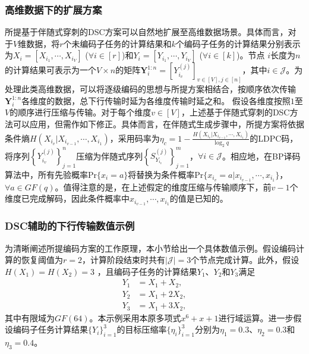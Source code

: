 \subsubsection{高维数据下的扩展方案}
所提基于伴随式穿刺的DSC方案可以自然地扩展至高维数据场景。具体而言，对于$V$维数据，将$r$个未编码子任务的计算结果和$k$个编码子任务的计算结果分别表示为$X_i = [X_{i_1}, \cdots, X_{i_V}]$ ($\forall i \in [r]$)和$Y_i = [Y_{i_1}, \cdots, Y_{i_V}]$ ($\forall i \in [k]$)。节点 $i$长度为$n$的计算结果可表示为一个$V\times n$的矩阵$\mathbf{Y}_i^{1:n} =
\left[Y_{i_v}^{(j)}\right]_{v\in[V],j\in[n]}$，其中$i\in\mathcal{J}$。为处理此类高维数据，可以将逐级编码的思想与所提方案相结合，按顺序依次传输$\mathbf{Y}_i^{1:n}$各维度的数据，总下行传输时延为各维度传输时延之和。
假设各维度按照$1$至$V$的顺序进行压缩与传输。对于每个维度$v\in[V]$，上述基于伴随式穿刺的DSC方法可以应用，但需作如下修正。具体而言，在伴随式生成步骤中，所提方案将依据条件熵$H(X_{i_v}|X_{i_{v-1}},\cdots,X_{i_1})$，采用码率为$\eta_c=1-\frac{H(X_{i_v}|X_{i_{v-1}},\cdots, X_{i_1})}{\log_2q}$的LDPC码，将序列$\left\{Y_{i_v}^{(j)}\right\}_{j=1}^n$压缩为伴随式序列$\left\{S_{Y_{i_v}}^{(j)}\right\}_{j=1}^m$，$\forall i\in\mathcal{J}$。相应地，在BP译码算法中，所有先验概率$\text{Pr}\{x_i=a\}$将替换为条件概率$\text{Pr}\{x_{i_v}=a|x_{i_{v-1}},\cdots,x_{i_1}\}$，$\forall a\in GF(q)$。值得注意的是，在上述假定的维度压缩与传输顺序下，前$v-1$个维度已完成解码，因此条件概率中$x_{i_{v-1}},\cdots,x_{i_1}$的值是已知的。

\subsubsection{DSC辅助的下行传输数值示例}
为清晰阐述所提编码方案的工作原理，本小节给出一个具体数值示例。假设编码计算的恢复阈值为$r=2$，计算阶段结束时共有$|\mathcal{J}|=3$个节点完成计算。此外，假设$H(X_1)=H(X_2)=3$
，且编码子任务的计算结果$Y_1$、$Y_2$和$Y_3$满足
\begin{subequations}\label{eq:toy}
	\begin{align}
		Y_1 &= X_1 + X_2, \label{eq:toy_y1} \\
		Y_2 &= X_1 + 2X_2, \label{eq:toy_y2} \\
		Y_3 &= X_1 + 3X_2, \label{eq:toy_y3}
	\end{align}
\end{subequations}
 其中有限域为$GF(64)$。本示例采用本原多项式$x^6+x+1$进行域运算。进一步假设编码子任务计算结果$\{Y_i\}_{i=1}^3$的目标压缩率$\{\eta_i\}_{i=1}^3$分别为$\eta_1=0.3$、$\eta_2=0.3$和$\eta_3=0.4$。

